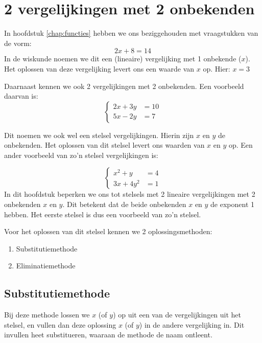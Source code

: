 \chapter{2 vergelijkingen met 2 onbekenden}
\label{chap:vergelijkingen}

In hoofdstuk \ref{chap:functies} hebben we ons beziggehouden met vraagstukken van de vorm: 
\[2x+8=14\] In de wiskunde noemen we dit een (lineaire) vergelijking met 1 onbekende ($x$). Het oplossen van deze vergelijking levert ons een waarde van $x$ op. Hier: $x=3$

Daarnaast kennen we ook 2 vergelijkingen met 2 onbekenden. Een voorbeeld daarvan is: 
\[
\begin{cases}
       2x+3y&=10 \\
       5x-2y&=7
\end{cases}
\]

Dit noemen we ook wel een stelsel vergelijkingen. Hierin zijn $x$ en $y$ de onbekenden. Het oplossen van dit stelsel levert ons waarden van $x$ en $y$ op. Een ander voorbeeld van zo'n stelsel vergelijkingen is:

\[
\begin{cases}
       x^2+y&=4 \\
       3x+4y^2&=1
\end{cases}
\]
In dit hoofdstuk beperken we ons tot stelsels met 2 lineaire vergelijkingen met 2 onbekenden $x$ en $y$. Dit betekent dat de beide onbekenden $x$ en $y$ de exponent 1 hebben. Het eerste stelsel is dus een voorbeeld van zo'n stelsel.

Voor het oplossen van dit stelsel kennen we 2 oplossingsmethoden:
\begin{enumerate}
    \item[-] Substitutiemethode
    \item[-] Eliminatiemethode
\end{enumerate}

\section{Substitutiemethode}
Bij deze methode lossen we $x$ (of $y$) op uit een van de vergelijkingen uit het stelsel, en vullen dan deze oplossing $x$ (of $y$) in de andere vergelijking in. Dit invullen heet substitueren, waaraan de methode de naam ontleent.

